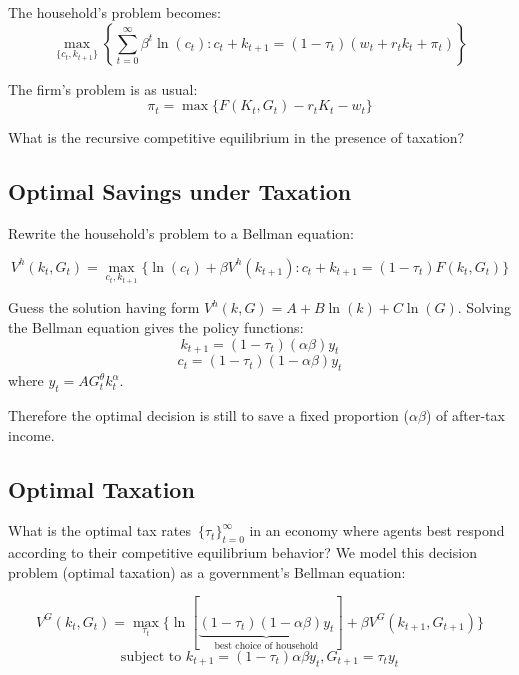 \documentclass[10pt,a4]{article}
\begin{document}
The household's problem becomes:
$$ \max_{\{c_t, k_{t+1}\}} \left\{ \sum_{t=0}^{\infty} \beta^t\ln(c_t): c_t + k_{t+1} = (1-\tau_t)(w_t + r_tk_t + \pi_t) \right\}$$

The firm's problem is as usual:
$$ \pi_t = \max \{F(K_t, G_t) - r_t K_t - w_t \}$$

What is the recursive competitive equilibrium in the presence of
taxation?~

\par\null

\subsection{Optimal Savings under
Taxation~~}

{\label{553361}}\par\null

Rewrite the household's problem to a Bellman equation:

$$V^h(k_t, G_t) = \max_{c_t,k_{t+1}} \{\ln(c_t) + \beta V^h(k_{t+1}): c_t + k_{t+1} = (1-\tau_t)F(k_t,G_t)\}$$



Guess the solution having form $V^h(k,G)=A + B\ln(k)+C\ln(G)$. 
Solving the Bellman equation gives the policy functions:
$$ k_{t+1} = (1-\tau_t)(\alpha\beta)y_t $$
$$ c_t = (1-\tau_t)(1-\alpha\beta)y_t $$
where $y_t = AG_t^{\theta}k_t^{\alpha}$.

Therefore the optimal decision is still to save a fixed proportion
(\(\alpha\beta\)) of after-tax income.

\par\null

\subsection{Optimal Taxation}

{\label{810937}}

What is the optimal tax rates~\(\{\tau_t\}_{t=0}^{\infty}\) in an economy where
agents best respond according to their competitive equilibrium behavior?
We model this decision problem (optimal taxation) as a government's
Bellman equation:

\par\null

$$V^G(k_t, G_t) = \max_{\tau_t} \{ \ln[\underbrace{(1-\tau_t)(1-\alpha\beta)y_t}_{\textrm{best choice of household}}] + \beta V^G(k_{t+1}, G_{t+1})\}$$
$$ \textrm{subject to } k_{t+1} = (1-\tau_t)\alpha\beta y_t, G_{t+1} = \tau_t y_t $$
\end{document}
